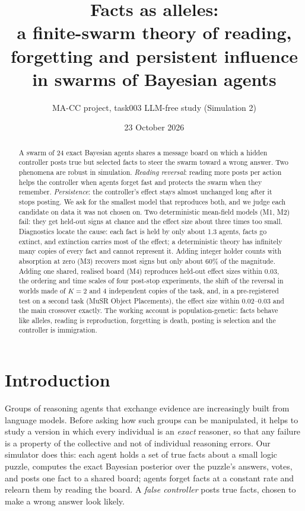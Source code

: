 \documentclass[10pt,a4paper]{article}
\title{\textbf{Facts as alleles:}\\[2pt] \textbf{a finite-swarm theory of reading, forgetting and persistent influence in swarms of Bayesian agents}}
\author{MA-CC project, task003 LLM-free study (Simulation 2)}
\date{23 October 2026}
\begin{document}
\maketitle

\begin{abstract}
\noindent
A swarm of 24 exact Bayesian agents shares a message board on which a hidden controller posts true but selected facts
to steer the swarm toward a wrong answer. Two phenomena are robust in simulation. \emph{Reading reversal}: reading more
posts per action helps the controller when agents forget fast and protects the swarm when they remember.
\emph{Persistence}: the controller's effect stays almost unchanged long after it stops posting. We ask for the smallest
model that reproduces both, and we judge each candidate on data it was not chosen on. Two deterministic mean-field
models (M1, M2) fail: they get held-out signs at chance and the effect size about three times too small. Diagnostics locate
the cause: each fact is held by only about 1.3 agents, facts go extinct, and extinction carries most of the effect;
a deterministic theory has infinitely many copies of every fact and cannot represent it. Adding integer holder counts
with absorption at zero (M3) recovers most signs but only about 60\% of the magnitude. Adding one shared, realised
board (M4) reproduces held-out effect sizes within 0.03, the ordering and time scales of four post-stop experiments,
the shift of the reversal in worlds made of $K=2$ and $4$ independent copies of the task, and, in a pre-registered
test on a second task (MuSR Object Placements), the effect size within 0.02--0.03 and the main crossover exactly.
The working account is population-genetic: facts behave like alleles, reading is reproduction, forgetting is death,
posting is selection and the controller is immigration.
\end{abstract}

\section{Introduction}

Groups of reasoning agents that exchange evidence are increasingly built from language models. Before asking how such
groups can be manipulated, it helps to study a version in which every individual is an \emph{exact} reasoner, so that
any failure is a property of the collective and not of individual reasoning errors. Our simulator does this: each agent
holds a set of true facts about a small logic puzzle, computes the exact Bayesian posterior over the puzzle's answers,
votes, and posts one fact to a shared board; agents forget facts at a constant rate and relearn them by reading the
board. A \emph{false controller} posts true facts, chosen to make a wrong answer look likely.
\end{document}
